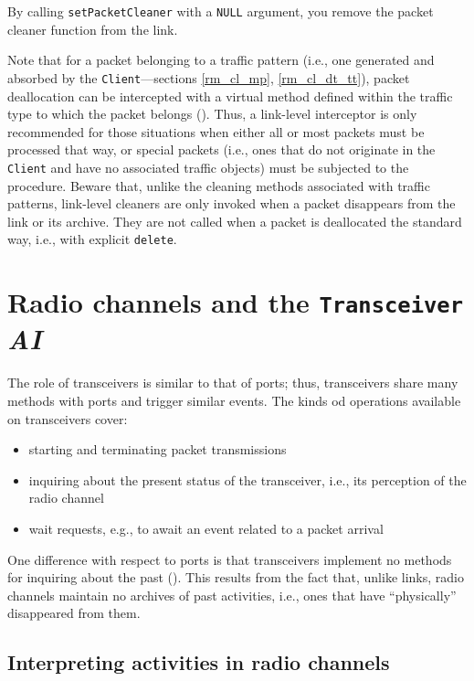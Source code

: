 By calling {\tt setPacketCleaner} with a {\tt NULL} argument, you remove the
packet cleaner function from the link.

Note that for a packet belonging to a traffic pattern (i.e., one generated and
absorbed by the {\tt Client}---sections \ref{rm_cl_mp},
\ref{rm_cl_dt_tt}), packet deallocation can be intercepted with
a virtual method defined within the traffic type to which the packet
belongs ().
Thus, a link-level interceptor is only recommended for those situations when
either all or most packets must be processed that way, or
special packets (i.e., ones that do not originate in the {\tt Client} and have
no associated traffic objects)
must be subjected to the procedure.
Beware that, unlike the cleaning methods associated with traffic patterns,
link-level cleaners are only invoked when a packet disappears from the link
or its archive.
They are not called when a packet is deallocated the standard way, i.e., with
explicit {\tt delete}.

\section{Radio channels and the {\tt Transceiver} {\em AI\/}}
\label{rm_tr}

The role of transceivers is similar to that of ports; thus,
transceivers share many methods with ports and trigger similar events.
The kinds od operations available on transceivers cover:
\begin{itemize}
\item
starting and terminating packet transmissions
\item
inquiring about the present status of the transceiver, i.e., its perception of
the radio channel
\item
wait requests, e.g., to await an event related to a packet arrival
\end{itemize}

One difference with respect to ports is that transceivers implement no methods
for inquiring about the past ().
This results from the fact that, unlike links, radio channels maintain no
archives of past activities, i.e., ones that have ``physically''
disappeared from them.

\subsection{Interpreting activities in radio channels}
\label{rm_tr_ra}

